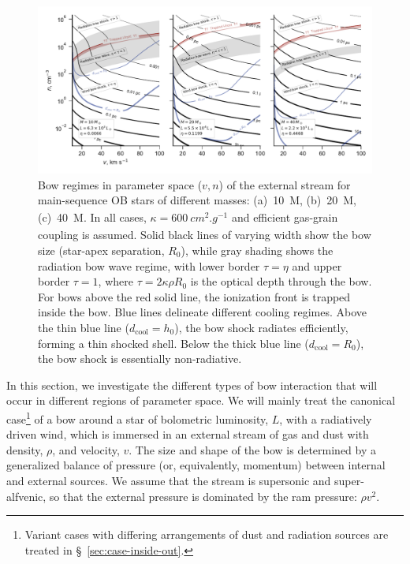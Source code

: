 \begin{figure}
  \includegraphics[width=\linewidth]{figs/zones-v-n-plane}
  \caption{Bow regimes in parameter space (\(v, n\)) of the external
    stream for main-sequence OB stars of different masses:
    (a)~\SI{10}{M_\odot}, (b)~\SI{20}{M_\odot}, (c)~\SI{40}{M_\odot}.  In all
    cases, \(\kappa = \SI{600}{cm^2.g^{-1}}\) and efficient gas-grain
    coupling is assumed. Solid black lines of varying width show the
    bow size (star-apex separation, \(R_0\)), while gray shading shows
    the radiation bow wave regime, with lower border \(\tau = \eta\) and
    upper border \(\tau = 1\), where \(\tau = 2 \kappa \rho R_0\) is the optical
    depth through the bow.  For bows above the red solid line, the
    ionization front is trapped inside the bow.  Blue lines delineate
    different cooling regimes.  Above the thin blue line
    (\(d_{\text{cool}} = h_0\)), the bow shock radiates efficiently,
    forming a thin shocked shell.  Below the thick blue line
    (\(d_{\text{cool}} = R_0\)), the bow shock is essentially
    non-radiative.}
  \label{fig:zones-v-n-plane}
\end{figure}

In this section, we investigate the different types of bow interaction
that will occur in different regions of parameter space. We will
mainly treat the canonical case\footnote{%
  Variant cases with differing arrangements of dust and radiation
  sources are treated in \S~\ref{sec:case-inside-out}.} %
of a bow around a star of bolometric luminosity, \(L\), with a
radiatively driven wind, which is immersed in an external stream of
gas and dust with density, \(\rho\), and velocity, \(v\).  The size and
shape of the bow is determined by a generalized balance of pressure
(or, equivalently, momentum) between internal and external sources.
We assume that the stream is supersonic and super-alfvenic, so that
the external pressure is dominated by the ram pressure: \(\rho v^2\).

